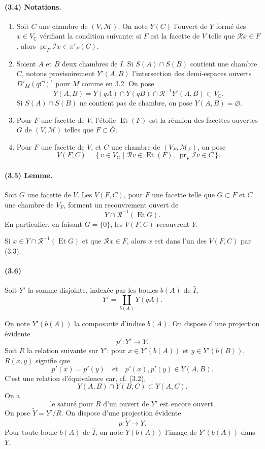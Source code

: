\documentclass[10pt,a4paper]{article}
\newcommand{\C}{\mathbb C}
\newcommand{\mcR}{\mathcal R}
\newcommand{\mcI}{\mathcal I}
\begin{document}
\paragraph{(3.4) Notations.}
\begin{enumerate}[label=(\roman*)]
\item Soit \(C\) une chambre de \((V,\mathcal M)\). On note \(Y(C)\) l'ouvert de \(Y\) formé des \(x\in V_\C\) vérifiant la condition suivante: si \(F\) est la facette de \(V\) telle que \(\mcR x\in F\), alors \(\operatorname{pr}_F\mcI x\in \pi'_F(C)\).
\item Soient \(A\) et \(B\) deux chambres de \(I\). Si \(S(A)\cap S(B)\) contient une chambre \(C\), notons provisoirement \(Y'(A,B)\) l'intersection des demi-espaces ouverts \(D'_M(qC)^\circ\) pour \(M\) comme en 3.2. On pose
\[
Y(A,B)=Y(qA)\cap Y(qB)\cap \mcR^{-1}Y'(A,B)\subset V_\C.
\]
Si \(S(A)\cap S(B)\) ne contient pas de chambre, on pose \(Y(A,B)=\varnothing\).
\item Pour \(F\) une facette de \(V\), l'étoile \(\operatorname{Et}(F)\) est la réunion des facettes ouvertes \(G\) de \((V,\mathcal M)\) telles que \(F\subset \overline G\).
\item Pour \(F\) une facette de \(V\), et \(C\) une chambre de \((V_F,\mathcal M_F)\), on pose
\[
V(F,C)=\{\,v\in V_\C\mid \mcR v\in\operatorname{Et}(F),\ \operatorname{pr}_F\mcI v\in C\,\}.
\]
\end{enumerate}

\paragraph{(3.5) Lemme.} Soit \(G\) une facette de \(V\). Les \(V(F,C)\), pour \(F\) une facette telle que \(G\subset\overline F\) et \(C\) une chambre de \(V_F\), forment un recouvrement ouvert de
\[
Y\cap \mcR^{-1}(\operatorname{Et}G).
\]
En particulier, en faisant \(G=\{0\}\), les \(V(F,C)\) recouvrent \(Y\).

Si \(x\in Y\cap\mcR^{-1}(\operatorname{Et}G)\) et que \(\mcR x\in F\), alors \(x\) est dans l'un des \(V(F,C)\) par (3.3).

\paragraph{(3.6)} Soit \(Y'\) la somme disjointe, indexée par les boules \(b(A)\) de \(\widehat I\),
\[
Y'=\coprod_{b(A)}Y(qA).
\]




On note \(Y'(b(A))\) la composante d'indice \(b(A)\). On dispose d'une projection évidente
\[
p':Y'\longrightarrow Y.
\]
Soit \(R\) la relation suivante sur \(Y'\): pour \(x\in Y'(b(A))\) et \(y\in Y'(b(B))\), \(R(x,y)\) signifie que
\[
p'(x)=p'(y)\quad\text{et}\quad p'(x),p'(y)\in Y(A,B).
\]
C'est une relation d'équivalence car, cf. (3.2),
\[
Y(A,B)\cap Y(B,C)\subset Y(A,C).
\]
On a
\[
\tag{3.6.1}
\text{le saturé pour }R\text{ d'un ouvert de }Y'\text{ est encore ouvert.}
\]
On pose \(\widetilde Y=Y'/R\). On dispose d'une projection évidente
\[
p:\widetilde Y\longrightarrow Y.
\]
Pour toute boule \(b(A)\) de \(\widehat I\), on note \(\widetilde Y(b(A))\) l'image de \(Y'(b(A))\) dans \(\widetilde Y\).
\end{document}
